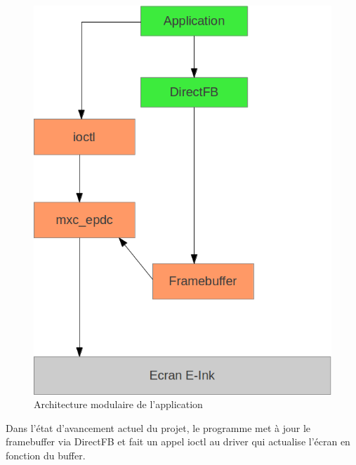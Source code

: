 \begin{figure}[h!]
	\begin{center}	
		\includegraphics[scale=0.5]{schema_direct_fb.png}
		\caption{Architecture modulaire de l'application}
	\end{center}
\end{figure}

Dans l'état d'avancement actuel du projet, le programme met à jour le framebuffer via DirectFB et fait un appel ioctl au driver qui actualise l'écran en fonction du buffer. 



%
